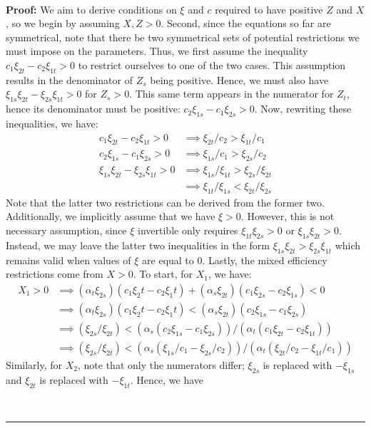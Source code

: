 \documentclass[11pt,a4paper]{extarticle}
\newenvironment{proof}[1][Proof]{\noindent\textbf{#1:} }{\ \rule{0.5em}{0.5em}}
\begin{document}
\hfill\\
\begin{proof}
	We aim to derive conditions on $\xi$ and $c$ required to have positive $Z$ and $X$, so we begin by assuming $X, Z  > 0$. Second, since the equations so far are symmetrical, note that there be two symmetrical sets of potential restrictions we must impose on the parameters. Thus, we first assume the inequality $c_1 \xi_{2t} - c_2 \xi_{1t} > 0$ to restrict ourselves to one of the two cases. This assumption results in the denominator of $Z_s$ being positive. Hence, we must also have $\xi_{1s}\xi_{2t} - \xi_{2s}\xi_{1t} > 0 $ for $Z_s > 0$. This same term appears in the numerator for $Z_t$, hence its denominator must be positive: $c_2 \xi_{1s} - c_1 \xi_{2s} > 0$. Now, rewriting these inequalities, we have:
	\begin{align*}
	c_1 \xi_{2t} - c_2 \xi_{1t} > 0 &\implies \xi_{2t}/c_2 > \xi_{1t}/c_1 \\
	c_2 \xi_{1s} - c_1 \xi_{2s} > 0 &\implies \xi_{1s}/c_1 > \xi_{2s}/c_2 \\
	\xi_{1s}\xi_{2t} - \xi_{2s}\xi_{1t} > 0 &\implies \xi_{1s}/\xi_{1t} > \xi_{2s}/\xi_{2t} \\
	&\implies \xi_{1t}/\xi_{1s} < \xi_{2t}/\xi_{2s} 
	\end{align*}
	Note that the latter two restrictions can be derived from the former two. Additionally, we implicitly assume that we have $\xi > 0$. However, this is not necessary assumption, since $\xi$ invertible only requires $\xi_{1t} \xi_{2s} > 0$ or $\xi_{1s} \xi_{2t} > 0$. Instead, we may leave the latter two inequalities in the form $ \xi_{1s}\xi_{2t} > \xi_{2s}\xi_{1t}$ which remains valid when values of $\xi$ are equal to $0$. Lastly, the mixed efficiency restrictions come from $X > 0$. To start, for $X_1$, we have:
	\begin{align*}
	X_1 > 0 &\implies (\alpha_t \xi_{2s})(c_1 \xi_2t - c_2\xi_1t) + (\alpha_s \xi_{2t})(c_1 \xi_{2s} - c_2 \xi_{1s}) < 0\\
	&\implies (\alpha_t \xi_{2s})(c_1 \xi_2t - c_2\xi_1t) < (\alpha_s \xi_{2t})(c_2 \xi_{1s} - c_1 \xi_{2s}) \\
	&\implies (\xi_{2s}/\xi_{2t}) < (\alpha_s (c_2 \xi_{1s} - c_1 \xi_{2s}))/(\alpha_t(c_1 \xi_{2t} - c_2\xi_{1t})) \\
	&\implies (\xi_{2s}/\xi_{2t}) < (\alpha_s (\xi_{1s}/c_1 -  \xi_{2s}/c_2))/(\alpha_t(\xi_{2t}/c_2 - \xi_{1t}/c_1)) 
	\end{align*}
	Similarly, for $X_2$, note that only the numerators differ; $\xi_{2s}$ is replaced with $-\xi_{1s}$ and $\xi_{2t}$ is replaced with $-\xi_{1t}$. Hence, we have

\end{proof}
\end{document}
